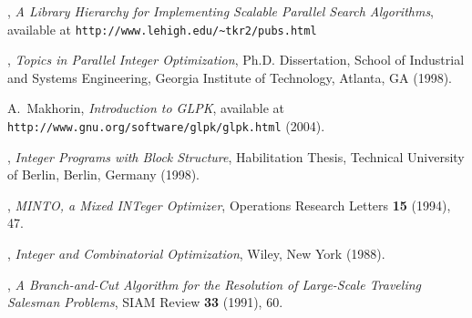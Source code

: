 \begin{thebibliography}{9}
,
{\em A Library Hierarchy for Implementing Scalable Parallel Search Algorithms},
available at {\tt http://www.lehigh.edu/\~{ }tkr2/pubs.html}




,
{\em Topics in Parallel Integer Optimization},
Ph.D. Dissertation, School of Industrial and Systems Engineering,
Georgia Institute of Technology, Atlanta, GA (1998).

{\sc A.~Makhorin}, {\em Introduction to GLPK}, available at 
\texttt{http://www.gnu.org/software/glpk/glpk.html} (2004).


, {\em Integer Programs with Block
Structure}, Habilitation Thesis, Technical University of Berlin,
Berlin, Germany (1998). 



, {\em MINTO, a Mixed INTeger Optimizer}, Operations
Research Letters {\bf 15} (1994), 47. 

, 
{\em Integer and Combinatorial Optimization}, Wiley, New York (1988).

, 
{\em A Branch-and-Cut Algorithm for the Resolution of Large-Scale
Traveling Salesman Problems},
SIAM Review {\bf 33} (1991), 60.


\end{thebibliography}
